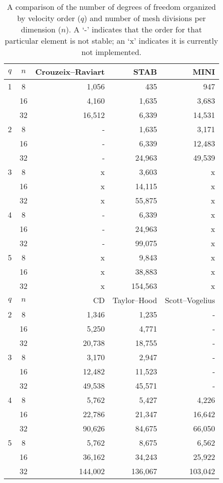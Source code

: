 \begin{table}[!t]
\linenumbersep-7.2pc
\centering
\small
\begin{tabular}{ccrrr}\toprule
    $q$ & $n$ & Crouzeix--Raviart & STAB & MINI \\\midrule
    1&  8 &   1,056 &   435 & 947  \\
      & 16 &   4,160 & 1,635 & 3,683 \\
      & 32 & 16,512 & 6,339 & 14,531 \\
    2 &  8 & - &     1,635 & 3,171 \\
       & 16 & - &    6,339 &  12,483 \\
       & 32 & - &  24,963 & 49,539 \\
    3 &  8 & x &    3,603 & x \\
       & 16 & x & 14,115 & x \\
       & 32 & x & 55,875 & x \\
    4 &  8 & - &    6,339 & x \\
       & 16 & - & 24,963 & x \\
       & 32 & - & 99,075 & x \\
    5 &  8 & x &      9,843 &  x \\
       & 16 & x &   38,883 &  x \\
       & 32 & x & 154,563 & x \\
    \midrule
    $q$ & $n$ & CD & Taylor--Hood & Scott--Vogelius \\
    \midrule
    2 &  8 &  1,346 &   1,235 & - \\
       & 16 &  5,250 &   4,771 & - \\
       & 32 & 20,738& 18,755 & - \\
    3 &  8 &   3,170 &   2,947 & - \\
       & 16 & 12,482 & 11,523 & - \\
       & 32 & 49,538 & 45,571 & - \\
    4 &  8 &   5,762 &    5,427 &   4,226 \\
       & 16 & 22,786 &  21,347 & 16,642 \\
       & 32 & 90,626 &  84,675 & 66,050 \\
    5 &  8 &      5,762 &     8,675 &     6,562 \\
       & 16 &   36,162 &   34,243 &   25,922 \\
       & 32 & 144,002 & 136,067 & 103,042 \\
    \bottomrule
\end{tabular}
  \caption{A comparison of the number of degrees of freedom organized
  by velocity order ($q$) and number of mesh divisions per dimension
  ($n$). A `-' indicates that the order for that particular element is
  not stable; an `x' indicates it is currently not
  implemented.}  \label{tab:terrel:DOFs}
\end{table}

